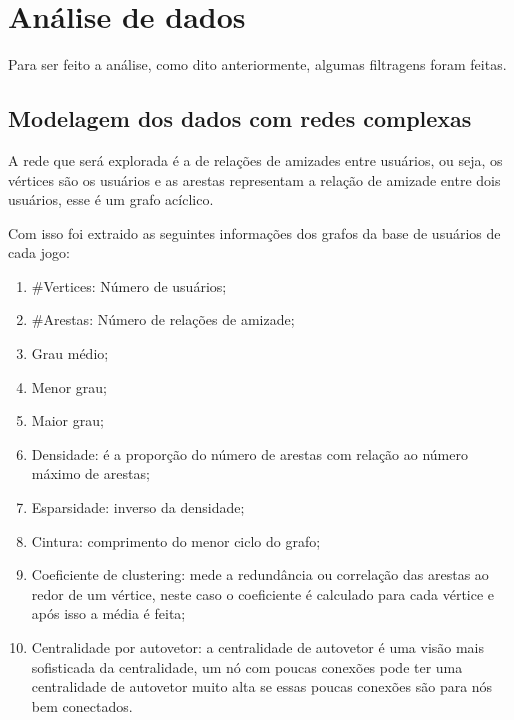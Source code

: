 \documentclass[12pt]{article}
\begin{document}
\section{Análise de dados}

Para ser feito a análise, como dito anteriormente, algumas filtragens foram feitas.

\subsection{Modelagem dos dados com redes complexas}

A rede que será explorada é a de relações de amizades entre usuários, ou seja, os vértices são os usuários e as arestas representam a relação de amizade entre dois usuários, esse é um grafo acíclico. 

Com isso foi extraido as seguintes informações dos grafos da base de usuários de cada jogo:

\begin{enumerate}
				\item \#Vertices: Número de usuários;
				\item \#Arestas: Número de relações de amizade;
				\item Grau médio;
				\item Menor grau;
				\item Maior grau;
				\item Densidade: é a proporção do número de arestas com relação ao número máximo de arestas;
				\item Esparsidade: inverso da densidade;
				\item Cintura: comprimento do menor ciclo do grafo;
				\item Coeficiente de clustering: mede a redundância ou correlação das arestas ao redor de um vértice, neste caso o coeficiente é calculado para cada vértice e após isso a média é feita;
				\item Centralidade por autovetor: a centralidade de autovetor é uma visão mais sofisticada da centralidade, um nó com poucas conexões pode ter uma centralidade de autovetor muito alta se essas poucas conexões são para nós bem conectados.
\end{enumerate}
\end{document}
